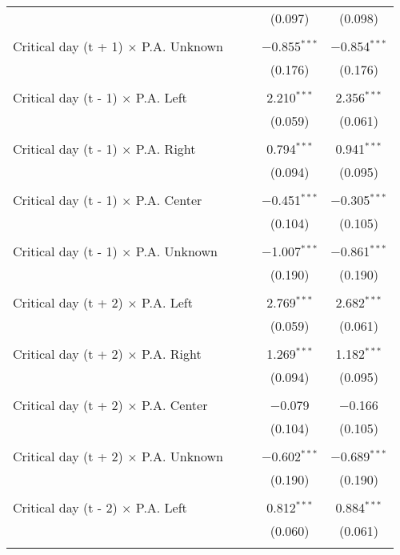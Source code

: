\documentclass[
]{article}
\begin{document}
\begin{table}[!htbp]
{\begin{tabular}{@{\extracolsep{5pt}}lcccc}
  &  &  & (0.097) & (0.098) \\ 
  & & & & \\ 
 Critical day (t + 1) $\times$ P.A. Unknown &  &  & $-$0.855$^{***}$ & $-$0.854$^{***}$ \\ 
  &  &  & (0.176) & (0.176) \\ 
  & & & & \\ 
 Critical day (t - 1) $\times$ P.A. Left &  &  & 2.210$^{***}$ & 2.356$^{***}$ \\ 
  &  &  & (0.059) & (0.061) \\ 
  & & & & \\ 
 Critical day (t - 1) $\times$ P.A. Right &  &  & 0.794$^{***}$ & 0.941$^{***}$ \\ 
  &  &  & (0.094) & (0.095) \\ 
  & & & & \\ 
 Critical day (t - 1) $\times$ P.A. Center &  &  & $-$0.451$^{***}$ & $-$0.305$^{***}$ \\ 
  &  &  & (0.104) & (0.105) \\ 
  & & & & \\ 
 Critical day (t - 1) $\times$ P.A. Unknown &  &  & $-$1.007$^{***}$ & $-$0.861$^{***}$ \\ 
  &  &  & (0.190) & (0.190) \\ 
  & & & & \\ 
 Critical day (t + 2) $\times$ P.A. Left &  &  & 2.769$^{***}$ & 2.682$^{***}$ \\ 
  &  &  & (0.059) & (0.061) \\ 
  & & & & \\ 
 Critical day (t + 2) $\times$ P.A. Right &  &  & 1.269$^{***}$ & 1.182$^{***}$ \\ 
  &  &  & (0.094) & (0.095) \\ 
  & & & & \\ 
 Critical day (t + 2) $\times$ P.A. Center &  &  & $-$0.079 & $-$0.166 \\ 
  &  &  & (0.104) & (0.105) \\ 
  & & & & \\ 
 Critical day (t + 2) $\times$ P.A. Unknown &  &  & $-$0.602$^{***}$ & $-$0.689$^{***}$ \\ 
  &  &  & (0.190) & (0.190) \\ 
  & & & & \\ 
 Critical day (t - 2) $\times$ P.A. Left &  &  & 0.812$^{***}$ & 0.884$^{***}$ \\ 
  &  &  & (0.060) & (0.061) \\ 
  & & & & \\ 

\end{tabular}}
\end{table}
\end{document}
